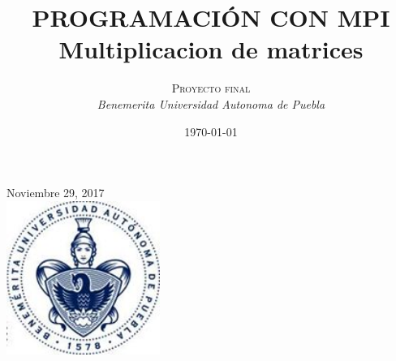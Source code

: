 \documentclass[12pt]{article}
\makeatletter
\renewcommand{\maketitle}{ %
\begin{flushright} %
{\LARGE\@title} %

\vspace{50pt} %

{\large\@author} %
\\\@date %

\vspace{40pt} %
\end{flushright}
}
\makeatother
\begin{document}
\begin{titlepage}
\begin{center}
{\large Noviembre 29, 2017}\\[1cm]


\includegraphics[width=5cm,height=5cm,keepaspectratio]{buap.png} %
 
\end{center}

\title{\textbf{PROGRAMACIÓN CON MPI}\\ %
Multiplicacion de matrices} %

\author{\textsc{Proyecto final} %
\\{\textit{Benemerita Universidad Autonoma de Puebla}}} %

\date{\today} %



\maketitle %




\end{titlepage}
\end{document}
